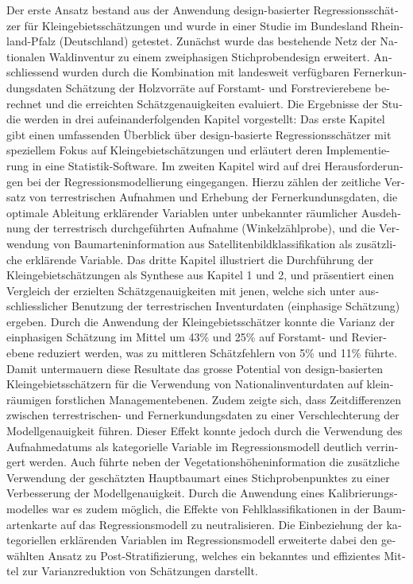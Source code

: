 \begin{otherlanguage}{ngerman}
Der erste Ansatz bestand aus der Anwendung design-basierter Regressionsschätzer für Kleingebietsschätzungen und wurde in einer Studie im Bundesland Rheinland-Pfalz (Deutschland) getestet. Zunächst wurde das bestehende Netz der Nationalen Waldinventur zu einem zweiphasigen Stichprobendesign erweitert. Anschliessend wurden durch die Kombination mit landesweit verfügbaren Fernerkundungsdaten Schätzung der Holzvorräte auf Forstamt- und Forstrevierebene berechnet und die erreichten Schätzgenauigkeiten evaluiert. Die Ergebnisse der Studie werden in drei aufeinanderfolgenden Kapitel vorgestellt: Das erste Kapitel gibt einen umfassenden Überblick über design-basierte Regressionsschätzer mit speziellem Fokus auf Kleingebietschätzungen und erläutert deren Implementierung in eine Statistik-Software. Im zweiten Kapitel wird auf drei Herausforderungen bei der Regressionsmodellierung eingegangen. Hierzu zählen der zeitliche Versatz von terrestrischen Aufnahmen und Erhebung der Fernerkundunsgdaten, die optimale Ableitung erklärender Variablen unter unbekannter räumlicher Ausdehnung der terrestrisch durchgeführten Aufnahme (Winkelzählprobe), und die Verwendung von Baumarteninformation aus Satellitenbildklassifikation als zusätzliche erklärende Variable. Das dritte Kapitel illustriert die Durchführung der Kleingebietschätzungen als Synthese aus Kapitel 1 und 2, und präsentiert einen Vergleich der erzielten Schätzgenauigkeiten mit jenen, welche sich unter ausschliesslicher Benutzung der terrestrischen Inventurdaten (einphasige Schätzung) ergeben. Durch die Anwendung der Kleingebietsschätzer konnte die Varianz der einphasigen Schätzung im Mittel um 43\% und 25\% auf Forstamt- und Revierebene reduziert werden, was zu mittleren Schätzfehlern von 5\% und 11\% führte. Damit untermauern diese Resultate das grosse Potential von design-basierten Kleingebietsschätzern für die Verwendung von Nationalinventurdaten auf kleinräumigen forstlichen Managementebenen. Zudem zeigte sich, dass Zeitdifferenzen zwischen terrestrischen- und Fernerkundungsdaten zu einer Verschlechterung der Modellgenauigkeit führen. Dieser Effekt konnte jedoch durch die Verwendung des Aufnahmedatums als kategorielle Variable im Regressionsmodell deutlich verringert werden. Auch führte neben der Vegetationshöheninformation die zusätzliche Verwendung der geschätzten Hauptbaumart eines Stichprobenpunktes zu einer Verbesserung der Modellgenauigkeit. Durch die Anwendung eines Kalibrierungsmodelles war es zudem möglich, die Effekte von Fehlklassifikationen in der Baumartenkarte auf das Regressionsmodell zu neutralisieren. Die Einbeziehung der kategoriellen erklärenden Variablen im Regressionsmodell erweiterte dabei den gewählten Ansatz zu Post-Stratifizierung, welches ein bekanntes und effizientes Mittel zur Varianzreduktion von Schätzungen darstellt.\par


\end{otherlanguage}
